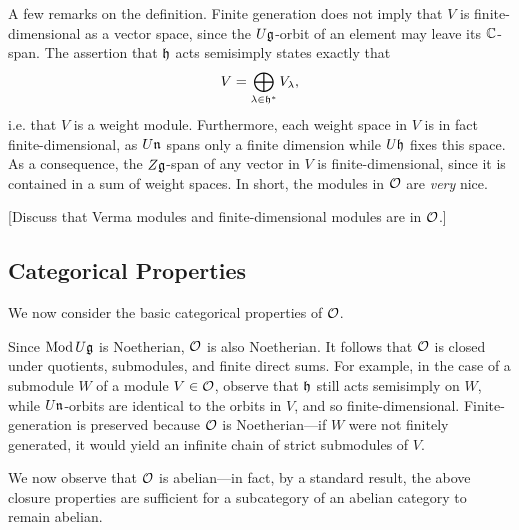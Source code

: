 \documentclass[11pt]{article}
\begin{document}
A few remarks on the definition. Finite generation does not imply that $V$ is
finite-dimensional as a vector space, since the $U\mathfrak{g}$-orbit of an element may
leave its $\mathbb{C}$-span. The assertion that $\mathfrak{h}$ acts semisimply states exactly
that\[ V = \bigoplus_{\lambda\in\mathfrak{h}^*}V_\lambda, \]i.e. that $V$ is a weight
module. Furthermore, each weight space in $V$ is in fact finite-dimensional, as
$U\mathfrak{n}$ spans only a finite dimension while $U\mathfrak{h}$ fixes this space. As a
consequence, the $Z\mathfrak{g}$-span of any vector in $V$ is finite-dimensional, since
it is contained in a sum of weight spaces. In short, the modules in $\mathcal{O}$
are \emph{very} nice.

	[Discuss that Verma modules and finite-dimensional modules are in $\mathcal{O}$.]

\subsection{Categorical Properties}

We now consider the basic categorical properties of $\mathcal{O}$.

Since $\operatorname{Mod} U\mathfrak{g}$ is Noetherian, $\mathcal{O}$ is also Noetherian. It follows that $\mathcal{O}$
is closed under quotients, submodules, and finite direct sums. For example, in
the case of a submodule $W$ of a module $V\in\mathcal{O}$, observe that $\mathfrak{h}$ still acts
semisimply on $W$, while $U\mathfrak{n}$-orbits are identical to the orbits in $V$, and
so finite-dimensional. Finite-generation is preserved because $\mathcal{O}$ is
Noetherian---if $W$ were not finitely generated, it would yield an infinite
chain of strict submodules of $V$.

We now observe that $\mathcal{O}$ is abelian---in fact, by a standard result, the above
closure properties are sufficient for a subcategory of an abelian category to
remain abelian.
\end{document}
